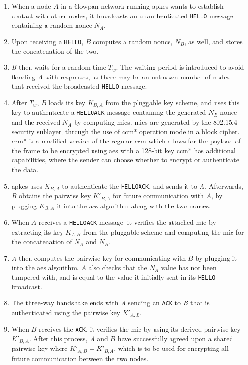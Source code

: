 \begin{enumerate}

\item When a node $A$ in a \gls{6lowpan} network running \gls{apkes} wants to establish contact with other nodes, it broadcasts an unauthenticated \texttt{HELLO} message containing a random nonce $N_A$.

\item Upon receiving a \texttt{HELLO}, $B$ computes a random nonce, $N_B$, as well, and stores the concatenation of the two.

\item $B$ then waits for a random time $T_w$. The waiting period is introduced to avoid flooding $A$ with responses, as there may be an unknown number of nodes that received the broadcasted \texttt{HELLO} message.

\item After $T_w$, $B$ loads its key $K_{B,A}$ from the pluggable key scheme, and uses this key to authenticate a \texttt{HELLOACK} message containing the generated $N_B$ nonce and the received $N_A$ by computing \gls{mic}s. \gls{mic}s are generated by the 802.15.4 security sublayer, through the use of \gls{ccm}* operation mode in a block cipher. \gls{ccm}* is a modified version of the regular \gls{ccm} which allows for the payload of the frame to be encrypted using \gls{aes} with a 128-bit key \cite{krentz20136lowpan} \gls{ccm}* has additional capabilities, where the sender can choose whether to encrypt or authenticate the data.

\item \gls{apkes} uses $K_{B,A}$ to authenticate the \texttt{HELLOACK}, and sends it to $A$. Afterwards, $B$ obtains the pairwise key $K'_{B,A}$ for future communication with $A$, by plugging $K_{B,A}$ it into the \gls{aes} algorithm along with the two nonces.

\item When $A$ receives a \texttt{HELLOACK} message, it verifies the attached \gls{mic} by extracting its key $K_{A,B}$ from the pluggable scheme and computing the \gls{mic} for the concatenation of $N_A$ and $N_B$.

\item $A$ then computes the pairwise key for communicating with $B$ by plugging it into the \gls{aes} algorithm. $A$ also checks that the $N_A$ value has not been tampered with, and is equal to the value it initially sent in its \texttt{HELLO} broadcast.

\item The three-way handshake ends with $A$ sending an \texttt{ACK} to $B$ that is authenticated using the pairwise key $K'_{A,B}$.

\item When $B$ receives the \texttt{ACK}, it verifies the \gls{mic} by using its derived pairwise key $K'_{B,A}$. After this process, $A$ and $B$ have successfully agreed upon a shared pairwise key where $K'_{A,B} = K'_{B,A}$, which is to be used for encrypting all future communication between the two nodes.

\end{enumerate}

